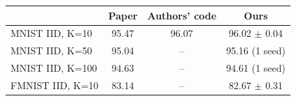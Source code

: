 \begin{tabular}{lccc}
\toprule
 & Paper & Authors' code & Ours \\
\midrule
MNIST IID, K=10 & 95.47 & 96.07 & 96.02 $\pm$ 0.04 \\
MNIST IID, K=50 & 95.04 & -- & 95.16 (1 seed) \\
MNIST IID, K=100 & 94.63 & -- & 94.61 (1 seed) \\
FMNIST IID, K=10 & 83.14 & -- & 82.67 $\pm$ 0.31 \\
\bottomrule
\end{tabular}
